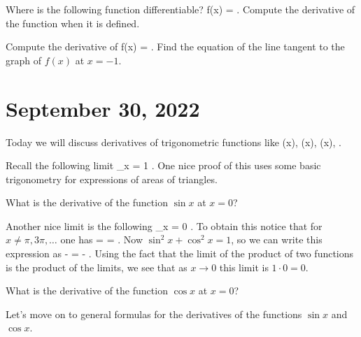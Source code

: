 \documentclass[11pt]{amsart}
\begin{document}
\begin{eg}
Where is the following function differentiable?
\beqn
f(x) =  .
\eeqn
Compute the derivative of the function when it is defined.
\end{eg}

\vspace{8cm}

\begin{eg}
Compute the derivative of 
\beqn
f(x) =  .
\eeqn
Find the equation of the line tangent to the graph of $f(x)$ at $x = -1$. 
\end{eg}

\newpage

\section*{September 30, 2022}

Today we will discuss derivatives of trigonometric functions like
\beqn
\sin(x), \quad \cos(x), \quad \tan(x), \quad {} .
\eeqn

Recall the following limit
\beqn
\lim_{x }  = 1 .
\eeqn
One nice proof of this uses some basic trigonometry for expressions of areas of triangles. 

\begin{eg}
What is the derivative of the function $\sin x$ at $x=0$? 
\end{eg}

\vspace{3cm} 

Another nice limit is the following 
\beqn
\lim_{x }  = 0 .
\eeqn
To obtain this notice that for $x \ne \pi,3 \pi, \ldots$ one has
\beqn
{} =  \cdot {} =  .
\eeqn
Now $\sin^2 x + \cos^2 x = 1$, so we can write this expression as 
\beqn
-  = -  \cdot {} .
\eeqn
Using the fact that the limit of the product of two functions is the product of the limits, we see that as $x \to 0$ this limit is $1 \cdot 0 = 0$. 

\begin{eg}
What is the derivative of the function $\cos x$ at $x = 0$? 
\end{eg}
\vspace{3cm}

Let's move on to general formulas for the derivatives of the functions $\sin x$ and $\cos x$. 
\end{document}
